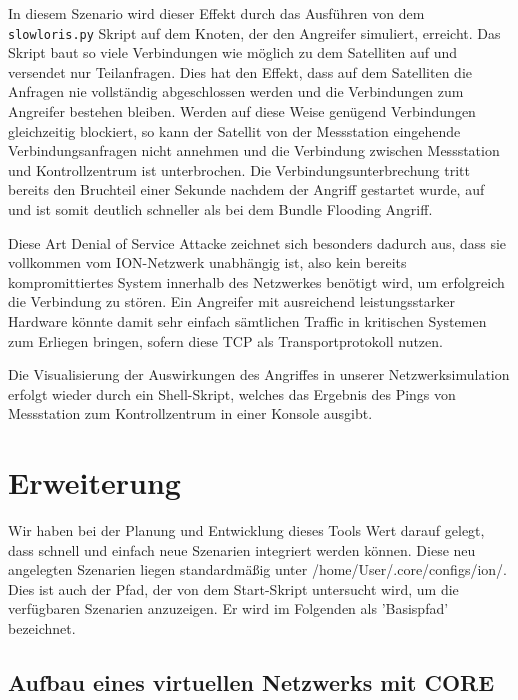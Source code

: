 \documentclass{article}
\begin{document}
In diesem Szenario wird dieser Effekt durch das Ausführen von dem \texttt{slowloris.py} Skript auf dem Knoten, der den Angreifer simuliert, erreicht. Das Skript baut so viele Verbindungen wie möglich zu dem Satelliten auf und versendet nur Teilanfragen. Dies hat den Effekt, dass auf dem Satelliten die Anfragen nie vollständig abgeschlossen werden und die Verbindungen zum Angreifer bestehen bleiben. Werden auf diese Weise genügend Verbindungen gleichzeitig blockiert, so kann der Satellit von der Messstation eingehende Verbindungsanfragen nicht annehmen und die Verbindung zwischen Messstation und Kontrollzentrum ist unterbrochen. Die Verbindungsunterbrechung tritt bereits den Bruchteil einer Sekunde nachdem der Angriff gestartet wurde, auf und ist somit deutlich schneller als bei dem Bundle Flooding Angriff.\par
Diese Art Denial of Service Attacke zeichnet sich besonders dadurch aus, dass sie vollkommen vom ION-Netzwerk unabhängig ist, also kein bereits kompromittiertes System innerhalb des Netzwerkes benötigt wird, um erfolgreich die Verbindung zu stören. Ein Angreifer mit ausreichend leistungsstarker Hardware könnte damit sehr einfach sämtlichen Traffic in kritischen Systemen zum Erliegen bringen, sofern diese TCP als Transportprotokoll nutzen.\par
Die Visualisierung der Auswirkungen des Angriffes in unserer Netzwerksimulation erfolgt wieder durch ein Shell-Skript, welches das Ergebnis des Pings von Messstation zum Kontrollzentrum in einer Konsole ausgibt.

\section{Erweiterung}
Wir haben bei der Planung und Entwicklung dieses Tools Wert darauf gelegt, dass schnell und einfach neue Szenarien integriert werden können. Diese neu angelegten Szenarien liegen standardmäßig unter /home/User/.core/configs/ion/. Dies ist auch der Pfad, der von dem Start-Skript untersucht wird, um die verfügbaren Szenarien anzuzeigen. Er wird im Folgenden als 'Basispfad' bezeichnet.\par


\subsection{Aufbau eines virtuellen Netzwerks mit CORE}
\end{document}
